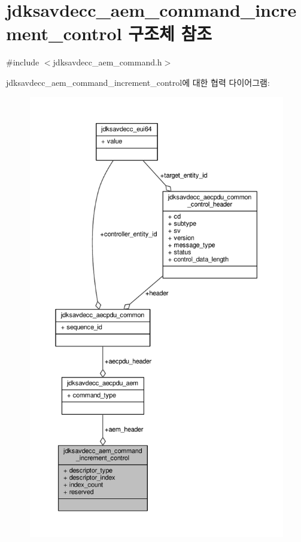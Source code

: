 \hypertarget{structjdksavdecc__aem__command__increment__control}{}\section{jdksavdecc\+\_\+aem\+\_\+command\+\_\+increment\+\_\+control 구조체 참조}
\label{structjdksavdecc__aem__command__increment__control}


{\ttfamily \#include $<$jdksavdecc\+\_\+aem\+\_\+command.\+h$>$}



jdksavdecc\+\_\+aem\+\_\+command\+\_\+increment\+\_\+control에 대한 협력 다이어그램\+:
\nopagebreak
\begin{figure}[H]
\begin{center}
\leavevmode
\includegraphics[height=550pt]{structjdksavdecc__aem__command__increment__control__coll__graph}
\end{center}
\end{figure}
